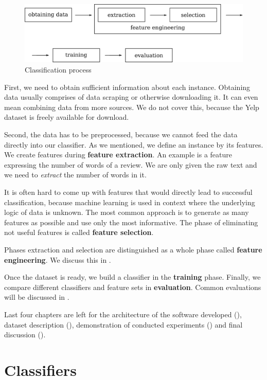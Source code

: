 \begin{figure}[h]
	\centering
	\includegraphics[width=12cm]{figures/clsf_process.eps}
	\caption{Classification process}\label{fig:clsf_process}
\end{figure}

First, we need to obtain sufficient information about each instance.
Obtaining data usually comprises of data scraping or otherwise downloading it.
It can even mean combining data from more sources.
We do not cover this, because the Yelp dataset is freely available for download.

Second, the data has to be preprocessed, because we cannot feed the data directly into our classifier.
As we mentioned, we define an instance by its features.
We create features during \textbf{feature extraction}.
An example is a feature expressing the number of words of a review.
We are only given the raw text and we need to \textit{extract} the number of words in it.

It is often hard to come up with features that would directly lead to successful classification,
because machine learning is used in context where the underlying logic of data is unknown.
The most common approach is to generate as many features as possible and use only the most informative.
The phase of eliminating not useful features is called \textbf{feature selection}.

Phases extraction and selection are distinguished as a whole phase called \textbf{feature engineering}.
We discuss this in .
 


Once the dataset is ready, we build a classifier in the \textbf{training} phase.
Finally, we compare different classifiers and feature sets in \textbf{evaluation}.
Common evaluations will be discussed in .

Last four chapters  are left for the architecture of the software developed (),
dataset description (),
demonstration of conducted experiments () and final discussion ().




\section{Classifiers}
\label{chap:clscon}

